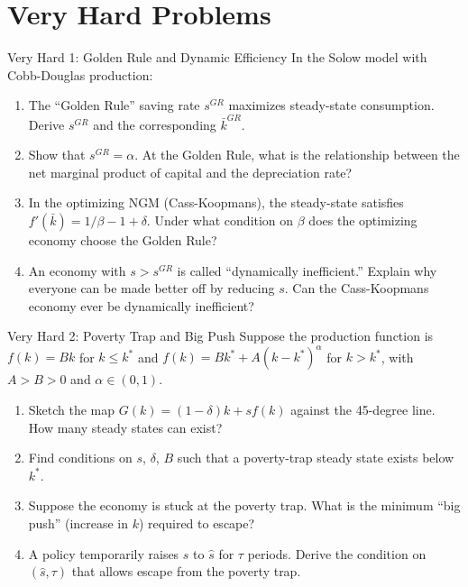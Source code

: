 \documentclass[aspectratio=169,10pt]{beamer}
\newcommand{\apxbutton}[1]{\hfill\hyperlink{#1}{\beamerbutton{Solution}}}
\begin{document}
\section{Very Hard Problems}

\begin{frame}{Very Hard 1: Golden Rule and Dynamic Efficiency}
\hypertarget{q-v1}{}
In the Solow model with Cobb-Douglas production:

\begin{enumerate}
  \item The ``Golden Rule'' saving rate $s^{GR}$ maximizes steady-state consumption. Derive $s^{GR}$ and the corresponding $\bar{k}^{GR}$.
  \item Show that $s^{GR} = \alpha$. At the Golden Rule, what is the relationship between the net marginal product of capital and the depreciation rate?
  \item In the optimizing NGM (Cass-Koopmans), the steady-state satisfies $f'(\bar{k}) = 1/\beta - 1 + \delta$. Under what condition on $\beta$ does the optimizing economy choose the Golden Rule?
  \item An economy with $s > s^{GR}$ is called ``dynamically inefficient.'' Explain why everyone can be made better off by reducing $s$. Can the Cass-Koopmans economy ever be dynamically inefficient?
\end{enumerate}
\apxbutton{s-v1}
\end{frame}

\begin{frame}{Very Hard 2: Poverty Trap and Big Push}
\hypertarget{q-v2}{}
Suppose the production function is $f(k) = Bk$ for $k \leq k^*$ and $f(k) = Bk^* + A(k-k^*)^\alpha$ for $k > k^*$, with $A > B > 0$ and $\alpha \in (0,1)$.

\begin{enumerate}
  \item Sketch the map $G(k) = (1-\delta)k + sf(k)$ against the 45-degree line. How many steady states can exist?
  \item Find conditions on $s$, $\delta$, $B$ such that a poverty-trap steady state exists below $k^*$.
  \item Suppose the economy is stuck at the poverty trap. What is the minimum ``big push'' (increase in $k$) required to escape?
  \item A policy temporarily raises $s$ to $\hat{s}$ for $\tau$ periods. Derive the condition on $(\hat{s}, \tau)$ that allows escape from the poverty trap.
\end{enumerate}
\apxbutton{s-v2}
\end{frame}
\end{document}
